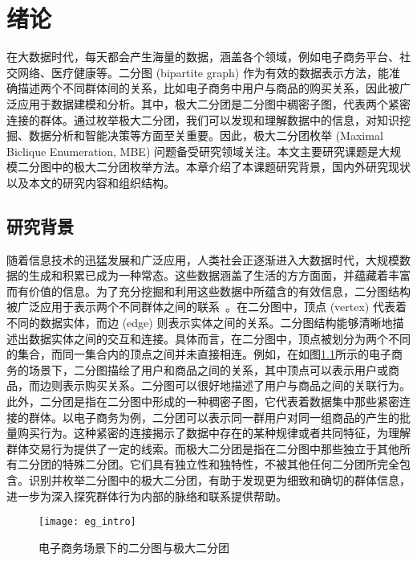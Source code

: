 \chapter{绪论}

在大数据时代，每天都会产生海量的数据，涵盖各个领域，例如电子商务平台、社交网络、医疗健康等。二分图 (bipartite graph) 作为有效的数据表示方法，能准确描述两个不同群体间的关系，比如电子商务中用户与商品的购买关系，因此被广泛应用于数据建模和分析。其中，极大二分团是二分图中稠密子图，代表两个紧密连接的群体。通过枚举极大二分团，我们可以发现和理解数据中的信息，对知识挖掘、数据分析和智能决策等方面至关重要。因此，极大二分团枚举 (Maximal Biclique Enumeration, MBE) 问题备受研究领域关注。本文主要研究课题是大规模二分图中的极大二分团枚举方法。本章介绍了本课题研究背景，国内外研究现状以及本文的研究内容和组织结构。

\section{研究背景}

随着信息技术的迅猛发展和广泛应用，人类社会正逐渐进入大数据时代，大规模数据的生成和积累已成为一种常态。这些数据涵盖了生活的方方面面，并蕴藏着丰富而有价值的信息。为了充分挖掘和利用这些数据中所蕴含的有效信息，二分图结构被广泛应用于表示两个不同群体之间的联系~\cite{bipartite22}。在二分图中，顶点 (vertex) 代表着不同的数据实体，而边 (edge) 则表示实体之间的关系。二分图结构能够清晰地描述出数据实体之间的交互和连接。具体而言，在二分图中，顶点被划分为两个不同的集合，而同一集合内的顶点之间并未直接相连。例如，在如图\ref{fig:eg_intro}所示的电子商务的场景下，二分图描绘了用户和商品之间的关系，其中顶点可以表示用户或商品，而边则表示购买关系。二分图可以很好地描述了用户与商品之间的关联行为。此外，二分团是指在二分图中形成的一种稠密子图，它代表着数据集中那些紧密连接的群体。以电子商务为例，二分团可以表示同一群用户对同一组商品的产生的批量购买行为。这种紧密的连接揭示了数据中存在的某种规律或者共同特征，为理解群体交易行为提供了一定的线索。而极大二分团是指在二分图中那些独立于其他所有二分团的特殊二分团。它们具有独立性和独特性，不被其他任何二分团所完全包含。识别并枚举二分图中的极大二分团，有助于发现更为细致和确切的群体信息，进一步为深入探究群体行为内部的脉络和联系提供帮助。

\begin{figure} [ht]
  \centering
  \vspace{0.1in}
  \texttt{[image: eg\_intro]}
  \vspace{0.1in}
  \caption{电子商务场景下的二分图与极大二分团}
  \label{fig:eg_intro}
\end{figure}


